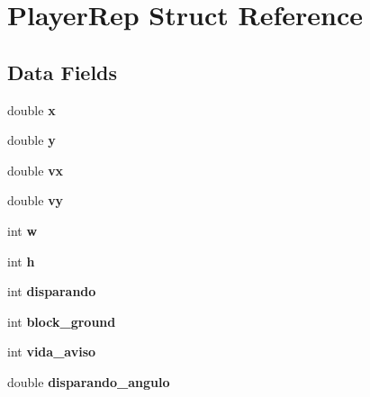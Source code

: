 \hypertarget{struct_player_rep}{}\section{Player\+Rep Struct Reference}
\label{struct_player_rep}
\subsection*{Data Fields}
\begin{DoxyCompactItemize}
\item 
\mbox{\label{struct_player_rep_ad1d6a48e9067540022643572ebd74015}} 
double {\bfseries x}
\item 
\mbox{\label{struct_player_rep_a116c882425a1d271482fa1a6a19a9895}} 
double {\bfseries y}
\item 
\mbox{\label{struct_player_rep_ac2d9317d2136d67efc187ffebd12cf54}} 
double {\bfseries vx}
\item 
\mbox{\label{struct_player_rep_a3a954a88f82bd08db6b152e2313054b8}} 
double {\bfseries vy}
\item 
\mbox{\label{struct_player_rep_a926bc0161b91fab510cb3faa9da52937}} 
int {\bfseries w}
\item 
\mbox{\label{struct_player_rep_a01d146d16beb64c2d4be68c42feb1368}} 
int {\bfseries h}
\item 
\mbox{\label{struct_player_rep_af989c71a9df045de67f8053266324006}} 
int {\bfseries disparando}
\item 
\mbox{\label{struct_player_rep_aeb270cfd6418902ddbad1b28a32bfa1e}} 
int {\bfseries block\+\_\+ground}
\item 
\mbox{\label{struct_player_rep_a7f22f579a70291231196f1d3cf7ecc72}} 
int {\bfseries vida\+\_\+aviso}
\item 
\mbox{\label{struct_player_rep_abfd92962ba2eb58a34f24ccf8ccdfae9}} 
double {\bfseries disparando\+\_\+angulo}
\item 

\end{DoxyCompactItemize}
